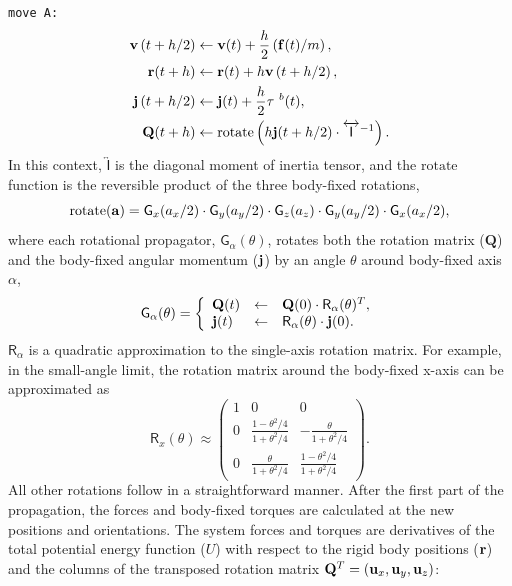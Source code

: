 \documentclass[]{book}
\begin{document}
{\tt move A:}
\begin{align*}
{\bf v}\left(t + h / 2\right)  &\leftarrow  {\bf v}(t)
    + \frac{h}{2} \left( {\bf f}(t) / m \right), \\
%
{\bf r}(t + h) &\leftarrow {\bf r}(t)
    + h  {\bf v}\left(t + h / 2 \right), \\
%
{\bf j}\left(t + h / 2 \right)  &\leftarrow {\bf j}(t)
    + \frac{h}{2} {\bf \tau}^{~b}(t), \\
%
{\bf Q}(t + h) &\leftarrow \mathrm{rotate}\left( h {\bf j}
    (t + h / 2) \cdot \overleftrightarrow{\mathsf{I}}^{-1} \right).
\end{align*}
In this context, $\overleftrightarrow{\mathsf{I}}$ is the diagonal
moment of inertia tensor, and the $\mathrm{rotate}$ function is the
reversible product of the three body-fixed rotations,
\begin{equation}
\mathrm{rotate}({\bf a}) = \mathsf{G}_x(a_x / 2) \cdot
\mathsf{G}_y(a_y / 2) \cdot \mathsf{G}_z(a_z) \cdot \mathsf{G}_y(a_y
/ 2) \cdot \mathsf{G}_x(a_x /2),
\end{equation}
where each rotational propagator, $\mathsf{G}_\alpha(\theta)$,
rotates both the rotation matrix ($\mathbf{Q}$) and the body-fixed
angular momentum (${\bf j}$) by an angle $\theta$ around body-fixed
axis $\alpha$,
\begin{equation}
\mathsf{G}_\alpha( \theta ) = \left\{
\begin{array}{lcl}
\mathbf{Q}(t) & \leftarrow & \mathbf{Q}(0) \cdot \mathsf{R}_\alpha(\theta)^T, \\
{\bf j}(t) & \leftarrow & \mathsf{R}_\alpha(\theta) \cdot {\bf
j}(0).
\end{array}
\right.
\end{equation}
$\mathsf{R}_\alpha$ is a quadratic approximation to the single-axis
rotation matrix.  For example, in the small-angle limit, the
rotation matrix around the body-fixed x-axis can be approximated as
\begin{equation}
\mathsf{R}_x(\theta) \approx \left(
\begin{array}{ccc}
1 & 0 & 0 \\
0 & \frac{1-\theta^2 / 4}{1 + \theta^2 / 4}  & -\frac{\theta}{1+
\theta^2 / 4} \\
0 & \frac{\theta}{1+ \theta^2 / 4} & \frac{1-\theta^2 / 4}{1 +
\theta^2 / 4}
\end{array}
\right).
\end{equation}
All other rotations follow in a straightforward manner. After the
first part of the propagation, the forces and body-fixed torques are
calculated at the new positions and orientations.  The system forces
and torques are derivatives of the total potential energy function
($U$) with respect to the rigid body positions (${\bf r}$) and the
columns of the transposed rotation matrix ${\bf Q}^T = \left({\bf
u}_x, {\bf u}_y, {\bf u}_z \right)$:
\end{document}
